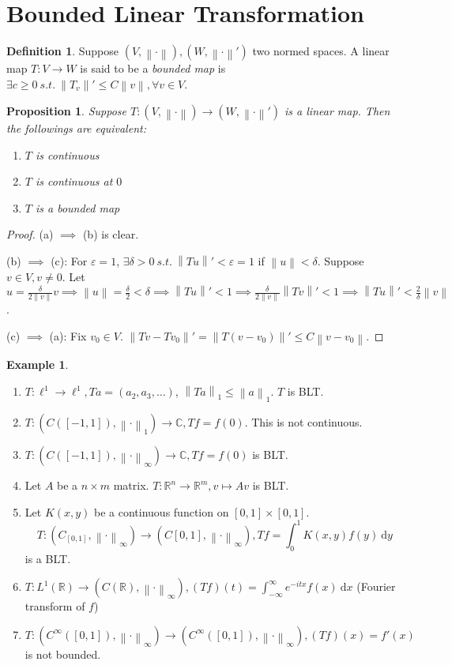 \documentclass{report}
\newcommand{\R}{\mathbb{R}}
\newcommand{\C}{\mathbb{C}}
\newcommand{\st}{\ s.t.\ }
\newcommand{\df}{\ \mathrm{d}}
\newcommand{\norm}[1]{\left\| #1 \right\|}
\newtheorem{proposition}[theorem]{Proposition}
\theoremstyle{definition}
\newtheorem{definition}[theorem]{Definition}
\newtheorem{example}[theorem]{Example}
\theoremstyle{remark}
\begin{document}
\section{Bounded Linear Transformation}
\begin{definition}
	Suppose $(V, \norm{\cdot}), (W, \norm{\cdot}')$ two normed spaces. A linear map $T: V \to W$ is said to be a \emph{bounded map} is $\exists c \geq 0 \st \norm{T_v}' \leq C\norm{v}, \forall v \in V$.
\end{definition}
\begin{proposition}
	Suppose $T: (V, \norm{\cdot}) \to (W, \norm{\cdot}')$ is a linear map. Then the followings are equivalent:
	\begin{enumerate}
		\item $T$ is continuous
		\item $T$ is continuous at $0$
		\item $T$ is a bounded map
	\end{enumerate}
\end{proposition}
\begin{proof}
	(a) $\implies$ (b) is clear.

	(b) $\implies$ (c): For $\varepsilon = 1$, $\exists \delta > 0 \st \norm{Tu}' < \varepsilon = 1$ if $\norm{u} < \delta$. Suppose $v \in V, v \neq 0$. Let $u = \frac{\delta}{2\norm{v}}v \implies \norm{u} = \frac{\delta}{2} < \delta \implies \norm{Tu}' < 1 \implies \frac{\delta}{2\norm{v}}\norm{Tv}' < 1 \implies \norm{Tu}' < \frac{2}{\delta}\norm{v}$.

	(c) $\implies$ (a): Fix $v_0 \in V$. $\norm{Tv - Tv_0}' = \norm{T(v - v_0)}' \leq C\norm{v - v_0}$.
\end{proof}

\begin{example}
	\begin{enumerate}
		\item $T: \ell^1 \to \ell^1, Ta = (a_2, a_3, \ldots)$, $\norm{Ta}_1 \leq \norm{a}_1$. $T$ is BLT.
		\item $T: (C([-1, 1]), \norm{\cdot}_1) \to \C, Tf=f(0)$. This is not continuous.
		\item $T: (C([-1, 1]), \norm{\cdot}_\infty) \to \C, Tf=f(0)$ is BLT.
		\item Let $A$ be a $n \times m$ matrix. $T: \R^n \to \R^m, v \mapsto Av$ is BLT.
		\item Let $K(x, y)$ be a continuous function on $[0, 1] \times [0, 1]$. \[T: (C_[0, 1], \norm{\cdot}_\infty) \to (C[0, 1], \norm{\cdot}_\infty), Tf = \int_0^1 K(x, y)f(y) \df y\] is a BLT.
		\item $\displaystyle T: L^1(\R) \to (C(\R), \norm{\cdot}_\infty), (Tf)(t) = \int_{-\infty}^\infty e^{-itx}f(x) \df x$ (Fourier transform of $f$)
		\item $T: (C^\infty([0, 1]), \norm{\cdot}_\infty) \to (C^\infty([0, 1]), \norm{\cdot}_\infty), (Tf)(x) = f'(x)$ is not bounded.
	\end{enumerate}
\end{example}
\end{document}
